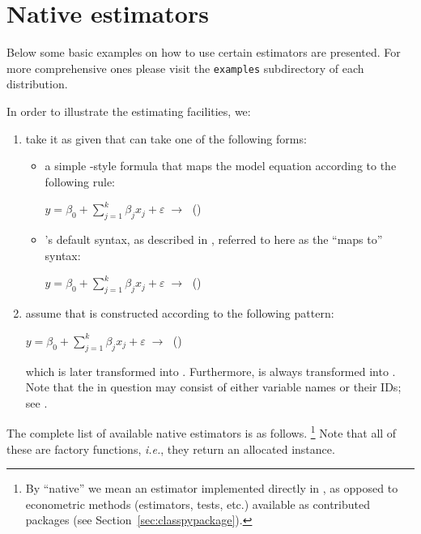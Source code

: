 \section{Native estimators}\label{sec:estimators_python_examples}
Below some basic examples on how to use certain estimators
are presented. For more comprehensive ones please visit
the \texttt{examples} subdirectory of each \gretlpy distribution.

In order to illustrate the \gretlpy estimating facilities, we:
\begin{enumerate}
	\item take it as given that  can
	take one of the following forms:
	\begin{itemize}
		\item a simple -style formula that
		maps the model equation according to the following rule:
		\begin{center}
			\hspace*{15pt}$\displaystyle y = \beta_0 + \sum_{j=1}^{k}\beta_jx_j + \varepsilon\;\rightarrow\;$%
			\hfill(\theequation)\label{eq:Rstyle}
		\end{center}

		\item \gretl's default syntax, as described in \cite{gretl_manual},
		referred to here as the ``maps to'' syntax:
		\begin{center}
			\hspace*{15pt}$\displaystyle y = \beta_0 + \sum_{j=1}^{k}\beta_jx_j + \varepsilon\;\rightarrow\;$%
			\hfill(\theequation)\label{eq:Gstyle}
		\end{center}
	\end{itemize}

	\item assume that  is constructed
	according to the following pattern:
	\begin{center}
		\hspace*{15pt}$\displaystyle y = \beta_0 + \sum_{j=1}^{k}\beta_jx_j + \varepsilon\;\rightarrow\;$%
		\pythcode{['y', 'const', 'x1', 'x2', ..., 'xk']}%
		\hfill(\theequation)\label{eq:GstyleList}
	\end{center}
	which is later transformed into .
	Furthermore,  is always
	transformed into .
	Note that the  in question may consist of either
	variable names or their IDs; see \citep[for details]{gretl_manual}.
\end{enumerate}
The complete list of available native estimators is as follows.%
\footnote{By ``native'' we mean an estimator implemented directly
	in \lgretl, as opposed to econometric methods (estimators,
	tests, etc.) available as contributed packages
	(see Section~\ref{sec:classpypackage}).}\newline
Note that all of these are factory functions, \textit{i.e.}, they
return an allocated \classpymodel instance.

